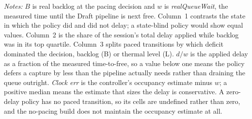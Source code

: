 \begin{table}[t]
  \par\vspace{2pt}
  \begin{minipage}{0.97\columnwidth}
    \scriptsize\emph{Notes:}
    \(B\) is real backlog at the pacing decision and \(w\) is \emph{realQueueWait},
    the measured time until the Draft pipeline is next free.
    Column~1 contrasts the state in which the policy did and did not delay; a
    state-blind policy would show equal values.
    Column~2 is the share of the session's total delay applied while backlog was
    in its top quartile.
    Column~3 splits paced transitions by which deficit dominated the decision,
    backlog (B) or thermal level (L).
    \(d/w\) is the applied delay as a fraction of the measured time-to-free, so a
    value below one means the policy defers a capture by less than the pipeline
    actually needs rather than draining the queue outright.
    \emph{Clock err} is the controller's occupancy estimate minus \(w\); a
    positive median means the estimate that sizes the delay is conservative.
    A zero-delay policy has no paced transition, so its cells are undefined
    rather than zero, and the no-pacing build does not maintain the occupancy
    estimate at all.
  \end{minipage}
\end{table}
